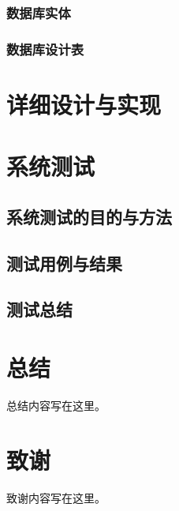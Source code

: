 \documentclass[12pt,a4paper]{article}%
\begin{document}
\subsubsection{数据库实体}
\subsubsection{数据库设计表}

\newpage

\section{详细设计与实现}

\newpage

\section{系统测试}
\subsection{系统测试的目的与方法}
\subsection{测试用例与结果}
\subsection{测试总结}

\section*{总结}%
总结内容写在这里。

\section*{致谢}
致谢内容写在这里。
\end{document}
